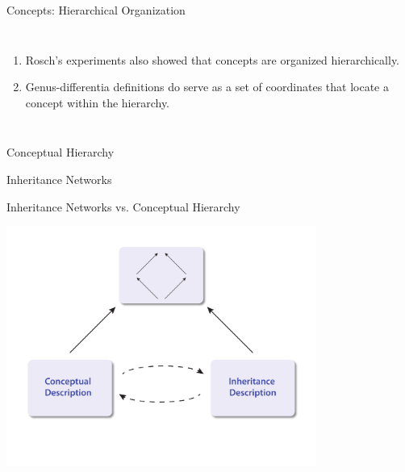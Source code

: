 \documentclass{beamer}
\begin{document}
\begin{frame}{Concepts: Hierarchical Organization}
\begin{columns}
\begin{enumerate}
	\item Rosch's experiments also showed that concepts are organized hierarchically.
\vspace{.125in}
	\item Genus-differentia definitions do serve as a set of coordinates that locate a concept within the hierarchy.
\end{enumerate}
\end{columns}
\end{frame}

\begin{frame}{Conceptual Hierarchy}
\centerline{
}
\end{frame}

\begin{frame}{Inheritance Networks}
\centerline{
}
\end{frame}

\begin{frame}{Inheritance Networks vs. Conceptual Hierarchy}
\begin{center}
\includegraphics[width=4in]{InheritanceVsConcepts_1}
\end{center}
\end{frame}
\end{document}
